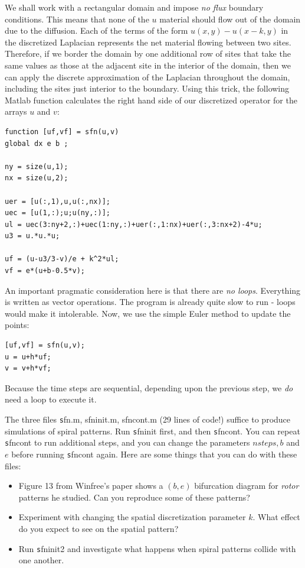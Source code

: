 \documentclass [11pt]{article}
\numberwithin{exercise}{section}
\begin{document}
We shall work with a rectangular domain and impose {\it no flux} boundary
conditions. This means that none of the $u$ material should flow out of the
domain due to the diffusion. Each of the terms of the form $u(x,y)- u(x-k,y)$
in the discretized Laplacian represents the net material flowing between 
two sites. Therefore, if we border the domain by one additional row of sites
that take the same values as those at the adjacent site in the interior of
the domain, then we can apply the discrete approximation of the Laplacian 
throughout the domain, including the sites just interior to the boundary.
Using this trick, the following Matlab function calculates the right
hand side of our discretized operator for the arrays $u$ and $v$:
\begin{verbatim}
function [uf,vf] = sfn(u,v)
global dx e b ;

ny = size(u,1);
nx = size(u,2);

uer = [u(:,1),u,u(:,nx)];
uec = [u(1,:);u;u(ny,:)];
ul = uec(3:ny+2,:)+uec(1:ny,:)+uer(:,1:nx)+uer(:,3:nx+2)-4*u;
u3 = u.*u.*u;

uf = (u-u3/3-v)/e + k^2*ul;
vf = e*(u+b-0.5*v);
\end{verbatim}
An important pragmatic consideration here is that there are {\it no loops}.
Everything is written as vector operations. The program is already quite
slow to run - loops would make it intolerable.
Now, we use the simple Euler method to update the points:
\begin{verbatim}
[uf,vf] = sfn(u,v);
u = u+h*uf;
v = v+h*vf;
\end{verbatim}
Because the time steps are sequential, depending upon the previous step,
we {\it do} need a loop to execute it.

The three files {\texttt sfn.m, sfninit.m, sfncont.m} (29 lines of code!)
suffice to produce simulations of spiral patterns. Run {\texttt sfninit} 
first, and then {\texttt sfncont}. You can repeat {\texttt sfncont} to 
run additional steps, and you can change the parameters $nsteps,b$ and $e$
before running {\texttt sfncont} again. Here are some things that you
can do with these files:
\begin{itemize}
\item Figure 13 from Winfree's paper shows a $(b,e)$ bifurcation diagram for 
{\it rotor} patterns he studied. Can you reproduce some of these patterns?
\item Experiment with changing the spatial discretization parameter $k$. What
effect do you expect to see on the spatial pattern?
\item Run {\texttt sfninit2} and 
investigate what happens when spiral patterns collide with one another. 
\end{itemize} 
\end{document}
